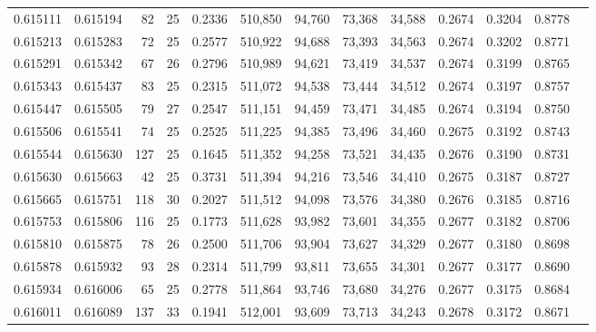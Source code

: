 \begin{tabular}{rrrrrrrrrrrrr}
0.615111 & 0.615194 &  82 &  25 &                                     0.2336 & 510,850 &  94,760 &  73,368 &  34,588 & 0.2674 & 0.3204 & 0.8778 \\
0.615213 & 0.615283 &  72 &  25 &                                     0.2577 & 510,922 &  94,688 &  73,393 &  34,563 & 0.2674 & 0.3202 & 0.8771 \\
0.615291 & 0.615342 &  67 &  26 &                                     0.2796 & 510,989 &  94,621 &  73,419 &  34,537 & 0.2674 & 0.3199 & 0.8765 \\
0.615343 & 0.615437 &  83 &  25 &                                     0.2315 & 511,072 &  94,538 &  73,444 &  34,512 & 0.2674 & 0.3197 & 0.8757 \\
0.615447 & 0.615505 &  79 &  27 &                                     0.2547 & 511,151 &  94,459 &  73,471 &  34,485 & 0.2674 & 0.3194 & 0.8750 \\
0.615506 & 0.615541 &  74 &  25 &                                     0.2525 & 511,225 &  94,385 &  73,496 &  34,460 & 0.2675 & 0.3192 & 0.8743 \\
0.615544 & 0.615630 & 127 &  25 &                                     0.1645 & 511,352 &  94,258 &  73,521 &  34,435 & 0.2676 & 0.3190 & 0.8731 \\
0.615630 & 0.615663 &  42 &  25 &                                     0.3731 & 511,394 &  94,216 &  73,546 &  34,410 & 0.2675 & 0.3187 & 0.8727 \\
0.615665 & 0.615751 & 118 &  30 &                                     0.2027 & 511,512 &  94,098 &  73,576 &  34,380 & 0.2676 & 0.3185 & 0.8716 \\
0.615753 & 0.615806 & 116 &  25 &                                     0.1773 & 511,628 &  93,982 &  73,601 &  34,355 & 0.2677 & 0.3182 & 0.8706 \\
0.615810 & 0.615875 &  78 &  26 &                                     0.2500 & 511,706 &  93,904 &  73,627 &  34,329 & 0.2677 & 0.3180 & 0.8698 \\
0.615878 & 0.615932 &  93 &  28 &                                     0.2314 & 511,799 &  93,811 &  73,655 &  34,301 & 0.2677 & 0.3177 & 0.8690 \\
0.615934 & 0.616006 &  65 &  25 &                                     0.2778 & 511,864 &  93,746 &  73,680 &  34,276 & 0.2677 & 0.3175 & 0.8684 \\
0.616011 & 0.616089 & 137 &  33 &                                     0.1941 & 512,001 &  93,609 &  73,713 &  34,243 & 0.2678 & 0.3172 & 0.8671 \\

\end{tabular}

